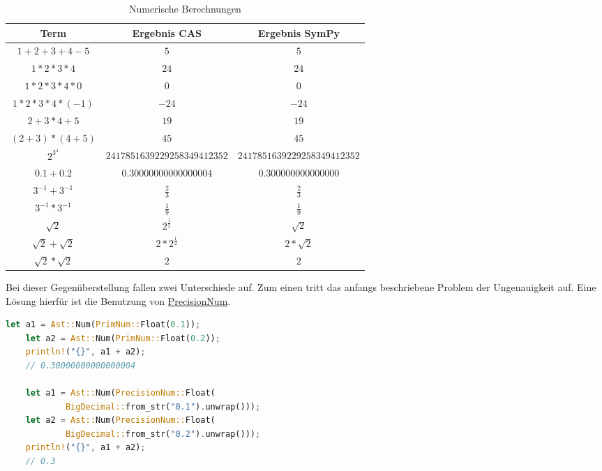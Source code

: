 \documentclass[11pt,a4paper, ngerman]{article}
\begin{document}
\begin{table}[ht!]
    \caption{Numerische Berechnungen}
    \centering
    \begin{tabular}{|c|c|c|}
        \hline
        \textbf{Term} & \textbf{Ergebnis CAS} & \textbf{Ergebnis SymPy} \\
        \hline
        $1+2+3+4-5$ & $5$ & $5$ \\
        \hline
        $1*2*3*4$ & $24$ & $24$ \\
        \hline
        $1*2*3*4*0$ & $0$ & $0$ \\
        \hline
        $1*2*3*4*(-1)$ & $-24$ & $-24$ \\
        \hline
        $2+3*4+5$ & $19$ & $19$ \\
        \hline
        $(2+3)*(4+5)$ & $45$ & $45$ \\
        \hline
        $2^{3^4}$ & $2417851639229258349412352$ & $2417851639229258349412352$ \\
        \hline
        $0.1+0.2$ & $0.30000000000000004$ & $0.300000000000000$ \\
        \hline
        $3^{-1} + 3^{-1}$ & $\frac{2}{3}$ & $\frac{2}{3}$ \\
        \hline
        $3^{-1} * 3^{-1}$ & $\frac{1}{9}$ & $\frac{1}{9}$ \\
        \hline
        $\sqrt{2}$ & $2^\frac{1}{2}$ & $\sqrt{2}$ \\
        \hline
        $\sqrt{2}+\sqrt{2}$ & $2*2^\frac{1}{2}$ &  $2*\sqrt{2}$ \\
        \hline
        $\sqrt{2}*\sqrt{2}$ & $2$ & $2$ \\
        \hline
    \end{tabular}
\end{table}

Bei dieser Gegenüberstellung fallen zwei Unterschiede auf. Zum einen tritt das anfangs beschriebene Problem der Ungenauigkeit auf. Eine Lösung hierfür ist die Benutzung von \hyperref[sec:NumTypes]{PrecisionNum}.

\begin{lstlisting}[language=rust, caption={PrimNum vs. PrecisionNum}]
    let a1 = Ast::Num(PrimNum::Float(0.1));
    let a2 = Ast::Num(PrimNum::Float(0.2));
    println!("{}", a1 + a2);
    // 0.30000000000000004

    let a1 = Ast::Num(PrecisionNum::Float(
            BigDecimal::from_str("0.1").unwrap()));
    let a2 = Ast::Num(PrecisionNum::Float(
            BigDecimal::from_str("0.2").unwrap()));
    println!("{}", a1 + a2);
    // 0.3
\end{lstlisting}
\end{document}
